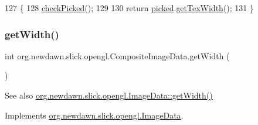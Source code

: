 \begin{DoxyCode}
127                              \{
128         \mbox{\hyperlink{classorg_1_1newdawn_1_1slick_1_1opengl_1_1_composite_image_data_a1a95487f3cd09ae6bf1458ffa1d433b8}{checkPicked}}();
129         
130         \textcolor{keywordflow}{return} \mbox{\hyperlink{classorg_1_1newdawn_1_1slick_1_1opengl_1_1_composite_image_data_a7238cbb20cc08b68a29935b4bc222da7}{picked}}.\mbox{\hyperlink{interfaceorg_1_1newdawn_1_1slick_1_1opengl_1_1_image_data_abf26e8dcbf2ec52f9a49535d8912263e}{getTexWidth}}();
131     \}
\end{DoxyCode}
\mbox{\label{classorg_1_1newdawn_1_1slick_1_1opengl_1_1_composite_image_data_afacb76ad47cbb2ce231c2f92ed87458c}} 
\subsubsection{\texorpdfstring{get\+Width()}{getWidth()}}
{\footnotesize\ttfamily int org.\+newdawn.\+slick.\+opengl.\+Composite\+Image\+Data.\+get\+Width (\begin{DoxyParamCaption}{ }\end{DoxyParamCaption})\hspace{0.3cm}{\ttfamily [inline]}}

\begin{DoxySeeAlso}{See also}
\mbox{\hyperlink{interfaceorg_1_1newdawn_1_1slick_1_1opengl_1_1_image_data_a59fd53f0ca1e501de35c1b2b4a7e69c5}{org.\+newdawn.\+slick.\+opengl.\+Image\+Data\+::get\+Width()}} 
\end{DoxySeeAlso}


Implements \mbox{\hyperlink{interfaceorg_1_1newdawn_1_1slick_1_1opengl_1_1_image_data_a59fd53f0ca1e501de35c1b2b4a7e69c5}{org.\+newdawn.\+slick.\+opengl.\+Image\+Data}}.


